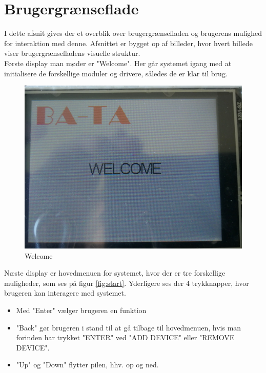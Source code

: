 \graphicspath{{Chapters/Userinterface/}}


\section{Brugergrænseflade}
I dette afsnit gives der et overblik over brugergrænsefladen og brugerens mulighed for interaktion med denne. Afsnittet er bygget op af billeder, hvor hvert billede viser brugergrænsefladens visuelle struktur. \\

Første display man møder er "Welcome". Her går systemet igang med at initialisere de forskellige moduler og drivere, således de er klar til brug.
\begin{figure}[H]
	\centering
	\includegraphics[width = 300 pt]{Img/welcome.jpg}
	\caption{Welcome}
	\label{fig:welcome}
\end{figure}



Næste display er hovedmenuen for systemet, hvor der er tre forskellige muligheder, som ses på figur     \ref{fig:start}. Yderligere ses der 4 trykknapper, hvor brugeren kan interagere med systemet.

\begin{itemize}  
	\item  Med "Enter" vælger brugeren en funktion
	\item "Back" gør brugeren i stand til at gå tilbage til hovedmenuen, hvis man forinden har trykket "ENTER" ved "ADD DEVICE" eller "REMOVE DEVICE".
	\item "Up" og "Down" flytter pilen, hhv. op og ned.
\end{itemize}

